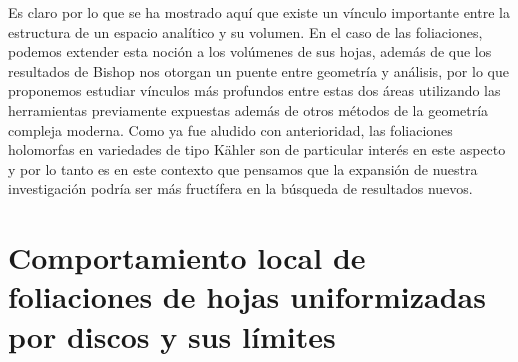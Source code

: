 \documentclass{article}
\begin{document}
Es claro por lo que se ha mostrado aqu\'i que existe un v\'inculo importante entre la estructura de un espacio anal\'itico y su volumen.
En el caso de las foliaciones, podemos extender esta noci\'on a los vol\'umenes de sus hojas, adem\'as de que los resultados de Bishop 
nos otorgan un puente entre geometr\'ia y an\'alisis, por lo que proponemos  estudiar v\'inculos m\'as profundos entre estas
dos \'areas utilizando las herramientas previamente expuestas adem\'as de otros m\'etodos de la geometr\'ia compleja moderna.
Como ya fue aludido con anterioridad, las foliaciones holomorfas en variedades de tipo K\"ahler son de particular inter\'es en este aspecto
y por lo tanto es en este contexto que pensamos que la expansi\'on de nuestra investigaci\'on podr\'ia ser m\'as fruct\'ifera en la
b\'usqueda de resultados nuevos.

\section{Comportamiento local de foliaciones de hojas uniformizadas por discos y sus l\'imites}
\end{document}

